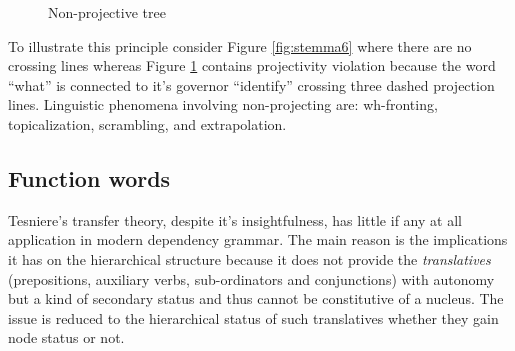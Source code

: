 \begin{figure}[!ht]
    \centering
    \caption{Non-projective tree}
    \label{fig:stemma7}
\end{figure}

To illustrate this principle consider Figure \ref{fig:stemma6} where there are no crossing lines whereas Figure \ref{fig:stemma7} contains projectivity violation because the word ``what'' is connected to it's governor ``identify'' crossing three dashed projection lines. Linguistic phenomena involving non-projecting are: wh-fronting, topicalization, scrambling, and extrapolation. 

\subsection{Function words}
Tesniere's transfer theory, despite it's insightfulness, has little if any at all application in modern dependency grammar. The main reason is the implications it has on the hierarchical structure because it does not provide the \textit{translatives} (prepositions, auxiliary verbs, sub-ordinators and conjunctions) with autonomy but a kind of secondary status and thus cannot be constitutive of a nucleus. The issue is reduced to the hierarchical status of such translatives whether they gain node status or not. 


